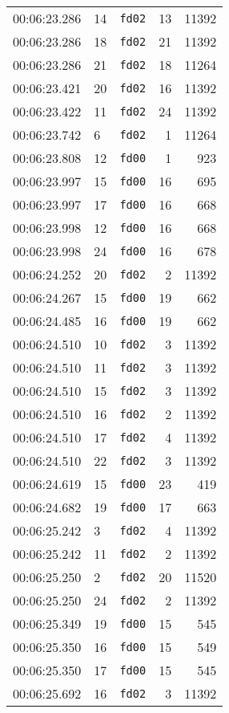 \documentclass{article}
\begin{document}
\begin{longtable}{lllrr}
00:06:23.286 & 14 & \texttt{fd02} & 13 & 11392 \\
00:06:23.286 & 18 & \texttt{fd02} & 21 & 11392 \\
00:06:23.286 & 21 & \texttt{fd02} & 18 & 11264 \\
00:06:23.421 & 20 & \texttt{fd02} & 16 & 11392 \\
00:06:23.422 & 11 & \texttt{fd02} & 24 & 11392 \\
00:06:23.742 & 6 & \texttt{fd02} & 1 & 11264 \\
00:06:23.808 & 12 & \texttt{fd00} & 1 & 923 \\
00:06:23.997 & 15 & \texttt{fd00} & 16 & 695 \\
00:06:23.997 & 17 & \texttt{fd00} & 16 & 668 \\
00:06:23.998 & 12 & \texttt{fd00} & 16 & 668 \\
00:06:23.998 & 24 & \texttt{fd00} & 16 & 678 \\
00:06:24.252 & 20 & \texttt{fd02} & 2 & 11392 \\
00:06:24.267 & 15 & \texttt{fd00} & 19 & 662 \\
00:06:24.485 & 16 & \texttt{fd00} & 19 & 662 \\
00:06:24.510 & 10 & \texttt{fd02} & 3 & 11392 \\
00:06:24.510 & 11 & \texttt{fd02} & 3 & 11392 \\
00:06:24.510 & 15 & \texttt{fd02} & 3 & 11392 \\
00:06:24.510 & 16 & \texttt{fd02} & 2 & 11392 \\
00:06:24.510 & 17 & \texttt{fd02} & 4 & 11392 \\
00:06:24.510 & 22 & \texttt{fd02} & 3 & 11392 \\
00:06:24.619 & 15 & \texttt{fd00} & 23 & 419 \\
00:06:24.682 & 19 & \texttt{fd00} & 17 & 663 \\
00:06:25.242 & 3 & \texttt{fd02} & 4 & 11392 \\
00:06:25.242 & 11 & \texttt{fd02} & 2 & 11392 \\
00:06:25.250 & 2 & \texttt{fd02} & 20 & 11520 \\
00:06:25.250 & 24 & \texttt{fd02} & 2 & 11392 \\
00:06:25.349 & 19 & \texttt{fd00} & 15 & 545 \\
00:06:25.350 & 16 & \texttt{fd00} & 15 & 549 \\
00:06:25.350 & 17 & \texttt{fd00} & 15 & 545 \\
00:06:25.692 & 16 & \texttt{fd02} & 3 & 11392 \\

\end{longtable}
\end{document}
